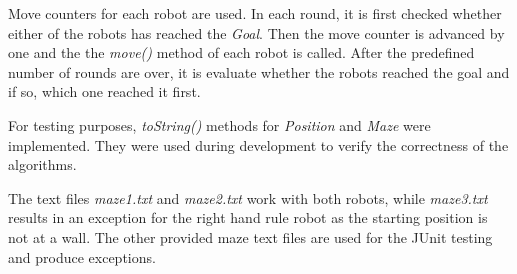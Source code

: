 \documentclass[a4paper,11pt,twoside]{article}
\begin{document}
Move counters for each robot are used. In each round, it is first
checked whether either of the robots has reached the
\textit{Goal}. Then the move counter is advanced by one and the the
\textit{move()} method of each robot is called.  After the predefined
number of rounds are over, it is evaluate whether the robots reached
the goal and if so, which one reached it first.

For testing purposes, \textit{toString()} methods for
\textit{Position} and \textit{Maze} were implemented. They were used
during development to verify the correctness of the algorithms. 

The text files \textit{maze1.txt} and \textit{maze2.txt} work with
both robots, while \textit{maze3.txt} results in an exception for the
right hand rule robot as the starting position is not at a wall. The
other provided maze text files are used for the JUnit testing and
produce exceptions. 


\end{document}
